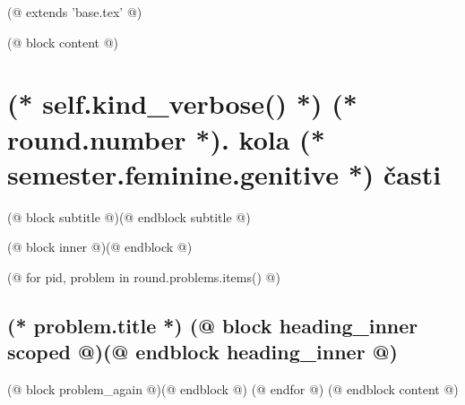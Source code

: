 (@ extends 'base.tex' @)

(@ block content @)
    \thispagestyle{seminar-booklet-first}

    \afterpage{\globaldefs=1\restoregeometry}

    \pagestyle{seminar-booklet-body}


    \section{%
        \texorpdfstring{%
            (* self.kind_verbose() *) (* round.number *). kola (* semester.feminine.genitive *) časti%
        }{%
            (* self.kind_verbose() *)%
        }%
    }
    (@ block subtitle @)(@ endblock subtitle @)

    \setcounter{volume}{(* volume.number *)}
    \setcounter{semester}{(* semester.number *)}
    \setcounter{round}{(* round.number *)}
    \setcounter{section}{(* round.number *)}

    (@ block inner @)(@ endblock @)

    (@ for pid, problem in round.problems.items() @)%
        \setcounter{problem}{(* problem.number *)}%

        \subsection{%
            \texorpdfstring{%
                \large \textbf{(* problem.title *)} \hfill \normalsize%
                (@ block heading_inner scoped @)(@ endblock heading_inner @)}{(* round.number *).(* problem.number *) (* problem.title *)}%
            \label{(* volume.id *)(* semester.id *)(* round.id *)(* problem.id *)}%
        }

        (@ block problem_again @)(@ endblock @)
    (@ endfor @)
(@ endblock content @)
